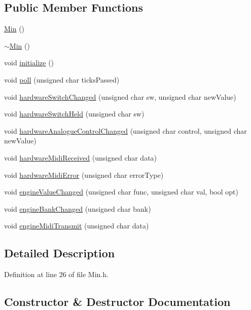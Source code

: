 \subsection*{Public Member Functions}
\begin{DoxyCompactItemize}
\item 
\hyperlink{class_min_a136258f6eb36642c84deb93ab60be785}{Min} ()
\item 
\hyperlink{class_min_a53df82489feb20336ea097d190a8d8db}{$\sim$\+Min} ()
\item 
void \hyperlink{class_min_a0fbb740ee813f44c6b0082d9a980875c}{initialize} ()
\item 
void \hyperlink{class_min_a4ed53c28c8c59dba741daf945dbc160b}{poll} (unsigned char ticks\+Passed)
\item 
void \hyperlink{class_min_ae00f275ac6aeb73f932e62ae85abe5b1}{hardware\+Switch\+Changed} (unsigned char sw, unsigned char new\+Value)
\item 
void \hyperlink{class_min_aa17c2510883d894f135d6a0582cc8bea}{hardware\+Switch\+Held} (unsigned char sw)
\item 
void \hyperlink{class_min_aead3e428133f75538420c1e67c532fa7}{hardware\+Analogue\+Control\+Changed} (unsigned char control, unsigned char new\+Value)
\item 
void \hyperlink{class_min_a8d4ebe4e020e14c2457d42f33c4c9e32}{hardware\+Midi\+Received} (unsigned char data)
\item 
void \hyperlink{class_min_a854b62697ad910d3bb0536fe7fd3d725}{hardware\+Midi\+Error} (unsigned char error\+Type)
\item 
void \hyperlink{class_min_a9fe42a8d40c06d73556cf6d0dac2dc71}{engine\+Value\+Changed} (unsigned char func, unsigned char val, bool opt)
\item 
void \hyperlink{class_min_a24ca9b52ba9755b458f6141d730bb9b1}{engine\+Bank\+Changed} (unsigned char bank)
\item 
void \hyperlink{class_min_a4b150119664bd46bd2a80561862ff666}{engine\+Midi\+Transmit} (unsigned char data)
\end{DoxyCompactItemize}


\subsection{Detailed Description}


Definition at line 26 of file Min.\+h.



\subsection{Constructor \& Destructor Documentation}
\mbox{\label{class_min_a136258f6eb36642c84deb93ab60be785}} 
